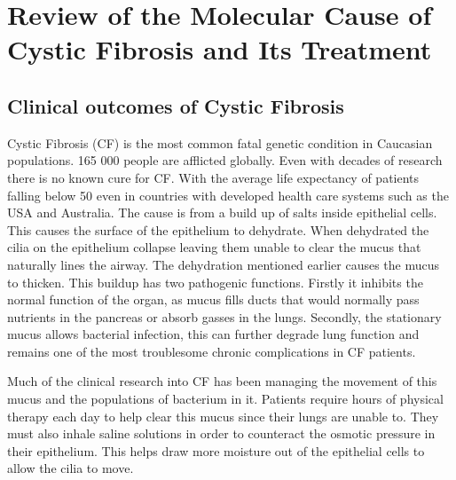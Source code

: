 \chapter{Review of the Molecular Cause of Cystic Fibrosis and Its Treatment}
\label{chap:cftr_review}
\newpage
\section{Clinical outcomes of Cystic Fibrosis}
Cystic Fibrosis (CF) is the most common fatal genetic condition in Caucasian populations. 165 000 people are afflicted globally. Even with decades of research there is no known cure for CF. With the average life expectancy of patients falling below 50 even in countries with developed health care systems such as the USA and Australia\cite{}\cite{}. The cause is from a build up of salts inside epithelial cells. This causes the surface of the epithelium to dehydrate. When dehydrated the cilia on the epithelium collapse leaving them unable to clear the mucus that naturally lines the airway\cite{boucher2007}. The dehydration mentioned earlier causes the mucus to thicken. This buildup has two pathogenic functions. Firstly it inhibits the normal function of the organ, as mucus fills ducts that would normally pass nutrients in the pancreas or absorb gasses in the lungs. Secondly, the stationary mucus allows bacterial infection, this can further degrade lung function and remains one of the most troublesome chronic complications in CF patients. 

Much of the clinical research into CF has been managing the movement of this mucus and the populations of bacterium in it. Patients require hours of physical therapy each day to help clear this mucus since their lungs are unable to. They must also inhale saline solutions in order to counteract the osmotic pressure in their epithelium. This helps draw more moisture out of the epithelial cells to allow the cilia to move. 

